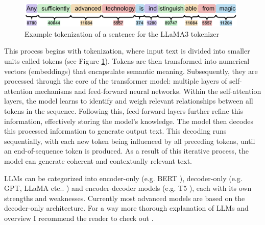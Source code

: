 \begin{figure}[h]
    \centering
    \vspace{0.25cm}
    \includegraphics[width=0.98\textwidth]{img/tokenization.pdf}
    \caption{Example tokenization of a sentence for the LLaMA3 tokenizer \citep{LLamaTokenizerPlayground}}
    \label{fig:tokenization}
\end{figure}
This process begins with tokenization, where input text is divided into smaller units called tokens (see Figure \ref{fig:tokenization}).
Tokens are then transformed into numerical vectors (embeddings) that encapsulate semantic meaning. Subsequently, they are processed through the core of the transformer model: multiple layers of self-attention mechanisms and feed-forward neural networks. Within the self-attention layers, the model learns to identify and weigh relevant relationships between all tokens in the sequence. Following this, feed-forward layers further refine this information, effectively storing the model's knowledge. The model then decodes this processed information to generate output text. This decoding runs sequentially, with each new token being influenced by all preceding tokens, until an end-of-sequence token is produced. As a result of this iterative process, the model can generate coherent and contextually relevant text.

LLMs can be categorized into encoder-only (e.g. BERT \citep{Devlin2018}), decoder-only (e.g. GPT, LLaMA etc.. \citep{Brown2020,LLaMA3}) and encoder-decoder models (e.g. T5 \citep{Raffel2019}), each with its own strengths and weaknesses. Currently most advanced models are based on the decoder-only architecture. For a way more thorough explanation of LLMs and overview I recommend the reader to check out \cite{Zhao2023}.

